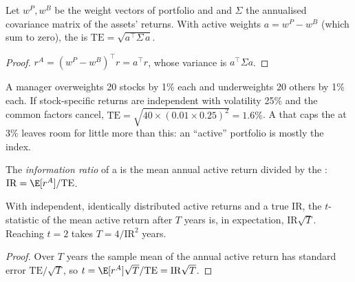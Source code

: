 \begin{proposition}\label{prop:m1:the-buy-side:te}
Let $w^P, w^B$ be the weight vectors of portfolio and  and $\Sigma$
the annualised covariance matrix of the assets' returns. With active weights
$a = w^P - w^B$ (which sum to zero), the  is
$\mathrm{TE} = \sqrt{a^\top \Sigma\, a}$.
\end{proposition}
\begin{proof}
$r^A = (w^P - w^B)^\top r = a^\top r$, whose variance is $a^\top\Sigma a$.
\end{proof}

\begin{example}\label{ex:m1:the-buy-side:bets}
A manager overweights 20 stocks by 1\% each and underweights 20 others by
1\% each. If stock-specific returns are independent with volatility 25\%
and the common factors cancel, $\mathrm{TE} = \sqrt{40 \times (0.01 \times
0.25)^2} = 1.6\%$. A  that caps the  at 3\% leaves room
for little more than this: an ``active'' portfolio is mostly the index.
\end{example}

\begin{definition}\label{def:m1:the-buy-side:ir}
The \emph{information ratio} of a  is the
mean annual active return divided by the :
$\mathrm{IR} = \E[r^A]/\mathrm{TE}$.
\end{definition}

\begin{proposition}\label{prop:m1:the-buy-side:years}
With independent, identically distributed active returns and a true
 $\mathrm{IR}$, the $t$-statistic of the mean active return
after $T$ years is, in expectation, $\mathrm{IR}\sqrt{T}$. Reaching $t = 2$
takes $T = 4/\mathrm{IR}^2$ years.
\end{proposition}
\begin{proof}
Over $T$ years the sample mean of the annual active return has standard
error $\mathrm{TE}/\sqrt{T}$, so $t = \E[r^A]\sqrt{T}/\mathrm{TE} =
\mathrm{IR}\sqrt{T}$.
\end{proof}

